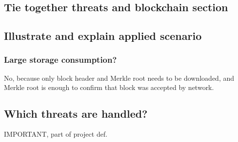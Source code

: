 
\subsection{Tie together threats and blockchain section}

\subsection{Illustrate and explain applied scenario}

\subsubsection{Large storage consumption?}
No, because only block header and Merkle root needs to be downloaded,
and Merkle root is enough to confirm that block was accepted by network.

\subsection{Which threats are handled?}
IMPORTANT, part of project def.
